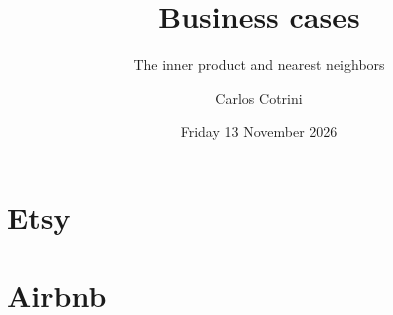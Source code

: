 \documentclass[aspectratio=169]{beamer}
\title{Business cases}
\subtitle{The inner product and nearest neighbors}
\author{Carlos Cotrini}
\institute{AI in Industry, ETH Zurich}
\date{Friday 13 November 2026}
\begin{document}
\begin{frame}
  \titlepage
\end{frame}
\section{Etsy}

\section{Airbnb}

\end{document}
